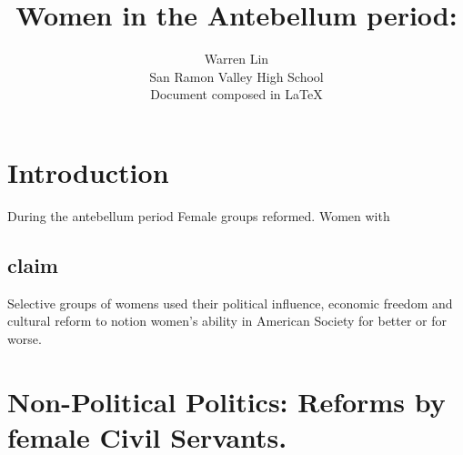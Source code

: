 \documentclass{article}
\title{Women in the Antebellum period:}
\author{Warren Lin\\ San Ramon Valley High School \\ Document composed in \LaTeX{}}
\begin{document}
\maketitle
\begin{abstract}


\end{abstract}

\section{Introduction}
During the antebellum period Female groups reformed. Women with
\subsection{claim}
Selective groups of womens used their political influence, economic freedom and cultural reform to notion women's ability in American Society for better or for worse.


\section{Non-Political Politics: Reforms by female Civil Servants.}

\end{document}
